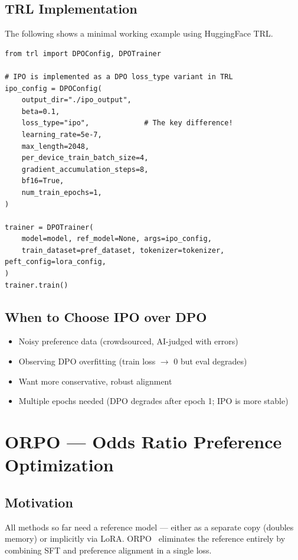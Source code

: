 \subsection{TRL Implementation}
\label{trl-implementation-2}

The following shows a minimal working example using HuggingFace TRL.

\begin{lstlisting}[style=pythonstyle]
from trl import DPOConfig, DPOTrainer

# IPO is implemented as a DPO loss_type variant in TRL
ipo_config = DPOConfig(
    output_dir="./ipo_output",
    beta=0.1,
    loss_type="ipo",             # The key difference!
    learning_rate=5e-7,
    max_length=2048,
    per_device_train_batch_size=4,
    gradient_accumulation_steps=8,
    bf16=True,
    num_train_epochs=1,
)

trainer = DPOTrainer(
    model=model, ref_model=None, args=ipo_config,
    train_dataset=pref_dataset, tokenizer=tokenizer, peft_config=lora_config,
)
trainer.train()
\end{lstlisting}

\subsection{When to Choose IPO over DPO}
\label{when-to-choose-ipo-over-dpo}

\begin{itemize}
  \item Noisy preference data (crowdsourced, AI-judged with errors)
  \item Observing DPO overfitting (train loss $\to$ 0 but eval degrades)
  \item Want more conservative, robust alignment
  \item Multiple epochs needed (DPO degrades after epoch 1; IPO is more stable)
\end{itemize}

\section{ORPO --- Odds Ratio Preference Optimization}
\label{sec:orpo}

\subsection{Motivation}
\label{motivation-3}

All methods so far need a reference model --- either as a separate copy (doubles memory) or implicitly via LoRA. ORPO~\cite{hong2024orpo} eliminates the reference entirely by combining SFT and preference alignment in a single loss.

